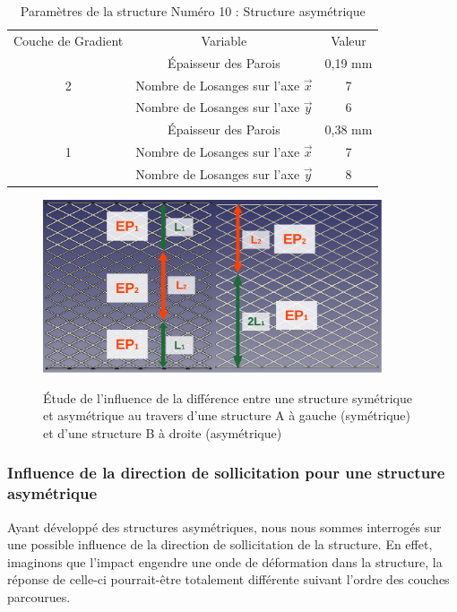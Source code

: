 \documentclass[a4paper]{article}
\begin{document}
	\begin{table}[H]
		\centering
		\begin{tabular}{|c|c|c|}
			\hline
			\rowcolor{Gray}
			\multicolumn{3}{c}{Structure Asymétrique : Structure 10}\\\hline
			\rowcolor{Gray}
			Couche de Gradient & Variable & Valeur\\
			\hline\hline
			& \textcolor[rgb]{1,0,0}{Épaisseur des Parois} & \textcolor[rgb]{1,0,0}{0,19 mm}\\
			\textcolor[rgb]{1,0,0}{2} & \textcolor[rgb]{1,0,0}{Nombre de Losanges sur l'axe $\vec{x}$} & \textcolor[rgb]{1,0,0}{7}\\
			& \textcolor[rgb]{1,0,0}{Nombre de Losanges sur l'axe $\vec{y}$} & \textcolor[rgb]{1,0,0}{6}\\
			\hline
			& \textcolor[rgb]{0,0.5,0}{Épaisseur des Parois} & \textcolor[rgb]{0,0.5,0}{0,38 mm}\\
			\textcolor[rgb]{0,0.5,0}{1} & \textcolor[rgb]{0,0.5,0}{Nombre de Losanges sur l'axe $\vec{x}$} & \textcolor[rgb]{0,0.5,0}{7}\\
			& \textcolor[rgb]{0,0.5,0}{Nombre de Losanges sur l'axe $\vec{y}$} & \textcolor[rgb]{0,0.5,0}{8}\\
			\hline
		\end{tabular}
		\caption{Paramètres de la structure Numéro 10 : Structure asymétrique}
	\end{table}
	
	\begin{figure}[H]
		\centering
		\includegraphics[width=10cm]{Images/6/symasym/symasym.pdf}\\
		\caption{Étude de l'influence de la différence entre une structure symétrique et asymétrique au travers d'une structure A à gauche (symétrique) et d'une structure B à droite (asymétrique)}
	\end{figure}
	
	\subsubsection{Influence de la direction de sollicitation pour une structure asymétrique}
	\label{directsol}
	\hspace{0.5cm}Ayant développé des structures asymétriques, nous nous sommes interrogés sur une possible influence de la direction de sollicitation de la structure. En effet, imaginons que l'impact engendre une onde de déformation dans la structure, la réponse de celle-ci pourrait-être totalement différente suivant l'ordre des couches parcourues.\\ 
	
\end{document}

